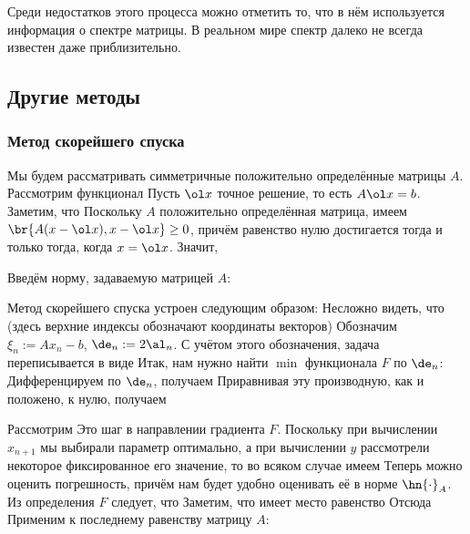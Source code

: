 \documentclass[a4paper]{article}
\begin{document}
Среди недостатков этого процесса можно отметить то, что в нём
используется информация о спектре матрицы. В реальном мире спектр
далеко не всегда известен даже приблизительно.

\subsection{Другие методы}

\subsubsection{Метод скорейшего спуска}

Мы будем рассматривать симметричные положительно определённые матрицы
$A$.  Рассмотрим функционал   Пусть $\ol
x$ точное решение, то есть $A\ol x = b$. Заметим, что   Поскольку $A$ положительно определённая матрица, имеем
$\br{A(x - \ol x), x - \ol x} \ge 0$, причём равенство нулю
достигается тогда и только тогда, когда $x = \ol x$.  Значит,

Введём норму, задаваемую матрицей $A$: 

Метод скорейшего спуска устроен следующим образом:   Несложно видеть, что (здесь верхние индексы
обозначают координаты векторов) 
Обозначим $\xi_n := Ax_n - b$, $\de_n := 2\al_n$.  С учётом этого
обозначения, задача переписывается в виде   Итак, нам нужно найти $\min$ функционала $F$ по $\de_n$:
  Дифференцируем
по $\de_n$, получаем   Приравнивая эту
производную, как и положено, к нулю, получаем 

Рассмотрим   Это шаг в
направлении градиента $F$. Поскольку при вычислении $x_{n+1}$ мы
выбирали параметр оптимально, а при вычислении $y$ рассмотрели
некоторое фиксированное его значение, то во всяком случае имеем
  Теперь можно
оценить погрешность, причём нам будет удобно оценивать её в норме
$\hn{\cdot}_A$.  Из определения $F$ следует, что
Заметим, что имеет место равенство   Отсюда   Применим к последнему равенству
матрицу $A$: 
\end{document}
